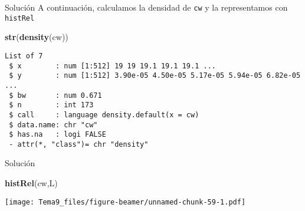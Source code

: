 \documentclass[
  ignorenonframetext,
]{beamer}
\newenvironment{Shaded}{\begin{snugshade}}{\end{snugshade}}
\newcommand{\KeywordTok}[1]{\textcolor[rgb]{0.13,0.29,0.53}{\textbf{#1}}}
\newcommand{\NormalTok}[1]{#1}
\begin{document}
\begin{frame}[fragile]{Solución}
\protect\hypertarget{soluciuxf3n-43}{}
A continuación, calculamos la densidad de \texttt{cw} y la representamos
con \texttt{histRel}

\begin{Shaded}
\begin{Highlighting}[]
\KeywordTok{str}\NormalTok{(}\KeywordTok{density}\NormalTok{(cw))}
\end{Highlighting}
\end{Shaded}

\begin{verbatim}
List of 7
 $ x        : num [1:512] 19 19 19.1 19.1 19.1 ...
 $ y        : num [1:512] 3.90e-05 4.50e-05 5.17e-05 5.94e-05 6.82e-05 ...
 $ bw       : num 0.671
 $ n        : int 173
 $ call     : language density.default(x = cw)
 $ data.name: chr "cw"
 $ has.na   : logi FALSE
 - attr(*, "class")= chr "density"
\end{verbatim}
\end{frame}

\begin{frame}[fragile]{Solución}
\protect\hypertarget{soluciuxf3n-44}{}
\begin{Shaded}
\begin{Highlighting}[]
\KeywordTok{histRel}\NormalTok{(cw,L)}
\end{Highlighting}
\end{Shaded}

\texttt{[image: Tema9\_files/figure-beamer/unnamed-chunk-59-1.pdf]}
\end{frame}
\end{document}
